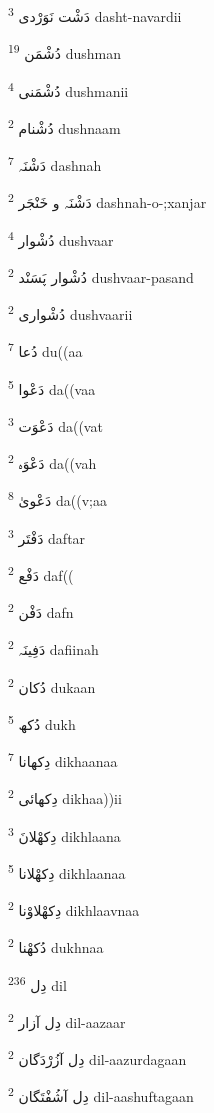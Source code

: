 \documentclass[12pt]{article}
\begin{document}
\begin{RTL}
\begin{multicols}{5}
{\ur دَشْت نَوَرْدی}   \textsuperscript{3} dasht-navardii

{\ur دُشْمَن}   \textsuperscript{19} dushman

{\ur دُشْمَنی}   \textsuperscript{4} dushmanii

{\ur دُشْنام}   \textsuperscript{2} dushnaam

{\ur دَشْنَہ}   \textsuperscript{7} dashnah

{\ur دَشْنَہ و خَنْجَر}   \textsuperscript{2} dashnah-o-;xanjar

{\ur دُشْوار}   \textsuperscript{4} dushvaar

{\ur دُشْوار پَسَنْد}   \textsuperscript{2} dushvaar-pasand

{\ur دُشْواری}   \textsuperscript{2} dushvaarii

{\ur دُعا}   \textsuperscript{7} du((aa

{\ur دَعْوا}   \textsuperscript{5} da((vaa

{\ur دَعْوَت}   \textsuperscript{3} da((vat

{\ur دَعْوَہ}   \textsuperscript{2} da((vah

{\ur دَعْویٰ}   \textsuperscript{8} da((v;aa

{\ur دَفْتَر}   \textsuperscript{3} daftar

{\ur دَفْع}   \textsuperscript{2} daf((

{\ur دَفْن}   \textsuperscript{2} dafn

{\ur دَفِینَہ}   \textsuperscript{2} dafiinah

{\ur دُکان}   \textsuperscript{2} dukaan

{\ur دُکھ}   \textsuperscript{5} dukh

{\ur دِکھانا}   \textsuperscript{7} dikhaanaa

{\ur دِکھائی}   \textsuperscript{2} dikhaa))ii

{\ur دِکھْلانَ}   \textsuperscript{3} dikhlaana

{\ur دِکھْلانا}   \textsuperscript{5} dikhlaanaa

{\ur دِکھْلاوْنا}   \textsuperscript{2} dikhlaavnaa

{\ur دُکھْنا}   \textsuperscript{2} dukhnaa

{\ur دِل}   \textsuperscript{236} dil

{\ur دِل آزار}   \textsuperscript{2} dil-aazaar

{\ur دِل آزُرْدَگان}   \textsuperscript{2} dil-aazurdagaan

{\ur دِل آشُفْتَگان}   \textsuperscript{2} dil-aashuftagaan


\end{multicols}
\end{RTL}
\end{document}
